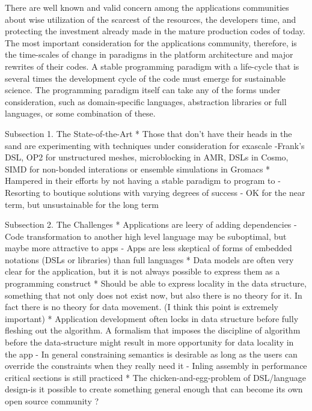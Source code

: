 There are well known and valid concern among the applications
communities about wise utilization of the scarcest of the resources,
the developers time, and protecting the investment already made in the
mature production codes of today. The most important consideration for
the applications community, therefore, is the time-scales of change in
paradigms in the platform architecture and major rewrites of their
codes. A stable programming paradigm with a life-cycle that is several 
times the development cycle of the code must emerge for sustainable
science. The programming paradigm itself can take any of the forms
under consideration, such as domain-specific languages, abstraction
libraries or full languages, or some combination of these. 
 
Subsection 1. The State-of-the-Art
* Those that don't have their heads in the sand are experimenting with
   techniques under consideration for exascale
   -Frank's DSL, OP2 for unstructured meshes, microblocking in AMR,
     DSLs in Cosmo, SIMD for non-bonded interations or ensemble
     simulations in Gromacs 
* Hampered in their efforts by not having a stable paradigm to program
  to 
   - Resorting to boutique solutions with varying degrees of success
   - OK for the near term, but unsustainable for the long term

Subsection 2. The Challenges
* Applications are leery of adding dependencies
   - Code transformation to another high level language may be
      suboptimal, but maybe more attractive to apps
   - Apps are less skeptical of forms of embedded notations (DSLs or
      libraries) than full languages
* Data models are often very clear for the application, but it is not
  always possible to express them as a programming construct
* Should be able to express locality in the data structure, something
  that not only does not exist now, but also there is no theory for
  it. In fact there is no theory for data movement. (I think this
  point is extremely important)
* Application development often locks in data structure before fully
   fleshing out the algorithm. A formalism that imposes the discipline
   of algorithm before the data-structure might result in more
   opportunity for data locality in the app
   - In general constraining semantics is desirable as long as the
      users can override the constraints when they really need it
   - Inling assembly in performance critical sections is still
      practiced
* The chicken-and-egg-problem of DSL/language design-is it possible to
   create something general enough that can become its own open source
   community ?

